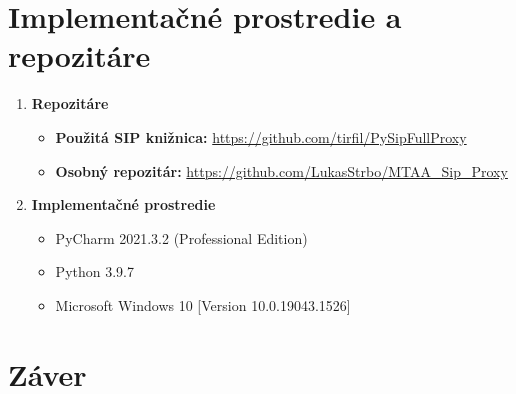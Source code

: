 \documentclass[10pt,oneside,slovak,a4paper]{article}
\begin{document}
\section{Implementačné prostredie a repozitáre}
\begin{enumerate}
	\item \textbf{Repozitáre}
	\begin{itemize}
		\item \textbf{Použitá SIP knižnica:} \url{https://github.com/tirfil/PySipFullProxy}
		\item \textbf{Osobný repozitár:} \url{https://github.com/LukasStrbo/MTAA_Sip_Proxy}
	\end{itemize}
	\item \textbf{Implementačné prostredie}
	\begin{itemize}
		\item PyCharm 2021.3.2 (Professional Edition)
		\item Python 3.9.7
		\item Microsoft Windows 10 [Version 10.0.19043.1526]
	\end{itemize}
\end{enumerate}

\section{Záver}




\end{document}
